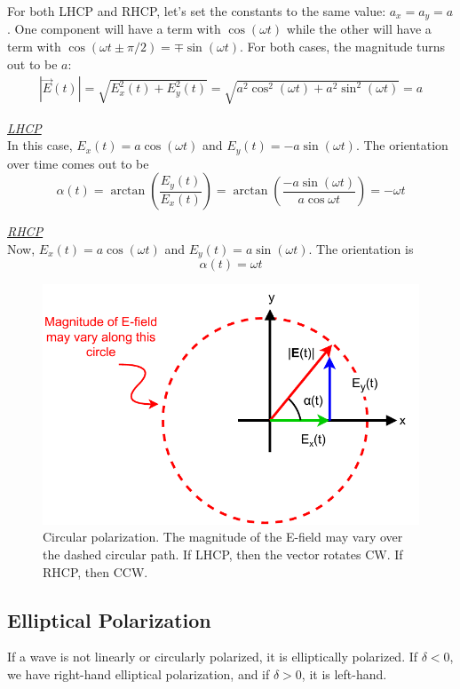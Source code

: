 For both LHCP and RHCP, let's set the constants to the same value: $a_x = a_y = a$. One component will have a term with $\cos(\omega t)$ while the other will have a term with $\cos(\omega t \pm \pi/2) = \mp \sin(\omega t)$. For both cases, the magnitude turns out to be $a$: 
\begin{align}
    |\vec{E}(t)| = \sqrt{E_x^2(t) + E_y^2(t)} = \sqrt{a^2\cos^2(\omega t) + a^2\sin^2(\omega t)} = a 
\end{align}

\underline{\large \textsl{LHCP}} \\[0.25cm] 
In this case, $E_x(t) = a\cos(\omega t)$ and $E_y(t) = -a\sin(\omega t)$. The orientation over time comes out to be 
\begin{equation}
    \alpha(t) = \arctan\left(\dfrac{E_y(t)}{E_x(t)}\right) = \arctan\left(\dfrac{-a\sin(\omega t)}{a\cos\omega t} \right) = -\omega t
\end{equation}

\vspace{0.5cm}

\underline{\large \textsl{RHCP}} \\[0.25cm] 
Now, $E_x(t) = a\cos(\omega t)$ and $E_y(t) = a\sin(\omega t)$. The orientation is 
\begin{equation}
    \alpha(t) = \omega t
\end{equation}

\begin{figure}[!htp]
    \centering
    \includegraphics[width=0.7\linewidth]{images/Plane Wave Propagation/CircularPolarization.pdf}
    \caption{Circular polarization. The magnitude of the E-field may vary over the dashed circular path. If LHCP, then the vector rotates CW. If RHCP, then CCW.}
    \label{fig:CircularPolarization}
\end{figure}

\subsection{Elliptical Polarization}
If a wave is not linearly or circularly polarized, it is elliptically polarized. If $\delta < 0$, we have right-hand elliptical polarization, and if $\delta > 0$, it is left-hand. 

